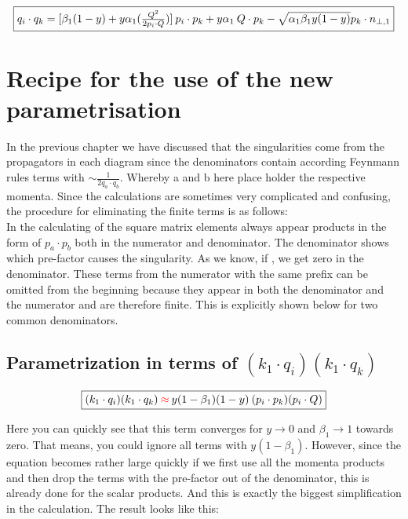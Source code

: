 \begin{equation}
	\begin{aligned}
		\fbox{$  q_i \cdot q_k = [\beta_1 (1-y)+y\alpha_1(\frac{Q^2}{2p_i \cdot Q})]\:p_i \cdot p_k+y\alpha_1\:Q\cdot p_k-\sqrt{\alpha_1\beta_1y(1-y)} p_k \cdot {n_{\bot,1}} $}
    \end{aligned}
\end{equation}
\section{Recipe for the use of the new parametrisation}
In the previous chapter we have discussed that the singularities come from the propagators in each diagram since the denominators contain according Feynmann rules terms with $\sim \frac{1}{2 q_a \cdot q_b}  $. Whereby a and b here place holder the respective momenta. Since the calculations are sometimes very complicated and confusing, the procedure for eliminating the finite terms is as follows:\\
In the calculating of the square matrix elements always appear products in the form of $ p_a \cdot p_b $ both in the numerator and denominator.
The denominator shows which pre-factor causes the singularity. As we know, if , we get zero in the denominator. These terms from the numerator with the same prefix can be omitted from the beginning because they appear in both the denominator and the numerator and are therefore finite. This is explicitly shown below for two common denominators.
\subsection{Parametrization in terms of $ (k_1 \cdot q_i )(k_1 \cdot q_k) $} 

\begin{equation}
	\begin{aligned}
		\fbox{$  (k_1 \cdot q_i )(k_1 \cdot q_k) {\color[RGB]{255,0,0} \: \approx\:} y(1-\beta_1) (1-y)\:(p_i \cdot p_k)(p_i \cdot Q) $}
    \end{aligned}
\label{k1qik1qk}
\end{equation}

Here you can quickly see that this term converges for 
$ y \rightarrow 0 $  and $ {\beta}_1 \rightarrow 1 $ towards zero. That means, you could ignore all terms with $  y(1-\beta_1)$. However, since the equation becomes rather large quickly if we first use all the momenta products and then drop the terms with the pre-factor out of the denominator, this is already done for the scalar products. And this is exactly the biggest simplification in the calculation. 
The result looks like this:

